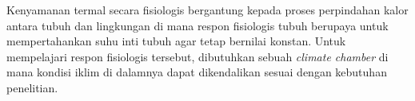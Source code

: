 Kenyamanan termal secara fisiologis bergantung kepada proses perpindahan kalor antara tubuh dan lingkungan di mana respon fisiologis tubuh berupaya untuk mempertahankan suhu inti tubuh agar tetap bernilai konstan. Untuk mempelajari respon fisiologis tersebut, dibutuhkan sebuah \textit{climate chamber} di mana kondisi iklim di dalamnya dapat dikendalikan sesuai dengan kebutuhan penelitian.




